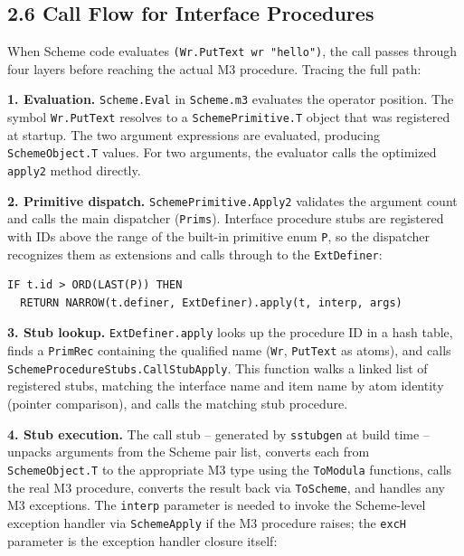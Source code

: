 \documentclass[
  12pt,
]{report}
\newcommand{\passthrough}[1]{#1}
\begin{document}
\subsection{2.6 Call Flow for Interface
Procedures}\label{call-flow-for-interface-procedures}

When Scheme code evaluates
\passthrough{\lstinline!(Wr.PutText wr "hello")!}, the call passes
through four layers before reaching the actual M3 procedure. Tracing the
full path:

\textbf{1. Evaluation.} \passthrough{\lstinline!Scheme.Eval!} in
\passthrough{\lstinline!Scheme.m3!} evaluates the operator position. The
symbol \passthrough{\lstinline!Wr.PutText!} resolves to a
\passthrough{\lstinline!SchemePrimitive.T!} object that was registered
at startup. The two argument expressions are evaluated, producing
\passthrough{\lstinline!SchemeObject.T!} values. For two arguments, the
evaluator calls the optimized \passthrough{\lstinline!apply2!} method
directly.

\textbf{2. Primitive dispatch.}
\passthrough{\lstinline!SchemePrimitive.Apply2!} validates the argument
count and calls the main dispatcher (\passthrough{\lstinline!Prims!}).
Interface procedure stubs are registered with IDs above the range of the
built-in primitive enum \passthrough{\lstinline!P!}, so the dispatcher
recognizes them as extensions and calls through to the
\passthrough{\lstinline!ExtDefiner!}:

\begin{lstlisting}
IF t.id > ORD(LAST(P)) THEN
  RETURN NARROW(t.definer, ExtDefiner).apply(t, interp, args)
\end{lstlisting}

\textbf{3. Stub lookup.} \passthrough{\lstinline!ExtDefiner.apply!}
looks up the procedure ID in a hash table, finds a
\passthrough{\lstinline!PrimRec!} containing the qualified name
(\passthrough{\lstinline!Wr!}, \passthrough{\lstinline!PutText!} as
atoms), and calls
\passthrough{\lstinline!SchemeProcedureStubs.CallStubApply!}. This
function walks a linked list of registered stubs, matching the interface
name and item name by atom identity (pointer comparison), and calls the
matching stub procedure.

\textbf{4. Stub execution.} The call stub -- generated by
\passthrough{\lstinline!sstubgen!} at build time -- unpacks arguments
from the Scheme pair list, converts each from
\passthrough{\lstinline!SchemeObject.T!} to the appropriate M3 type
using the \passthrough{\lstinline!ToModula!} functions, calls the real
M3 procedure, converts the result back via
\passthrough{\lstinline!ToScheme!}, and handles any M3 exceptions. The
\passthrough{\lstinline!interp!} parameter is needed to invoke the
Scheme-level exception handler via \passthrough{\lstinline!SchemeApply!}
if the M3 procedure raises; the \passthrough{\lstinline!excH!} parameter
is the exception handler closure itself:
\end{document}
